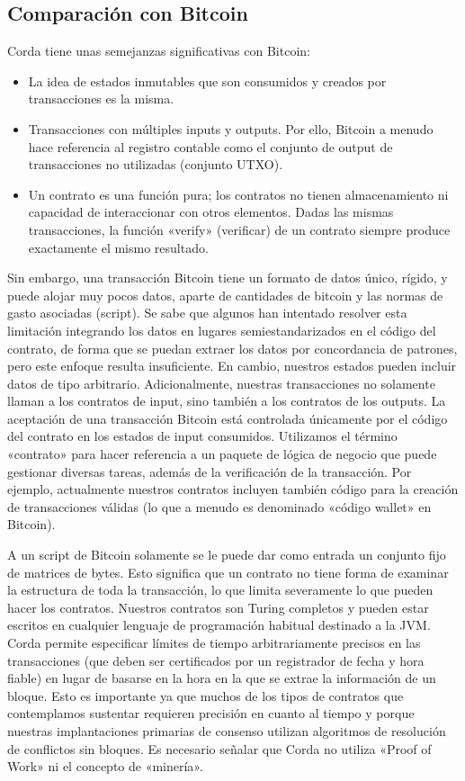 \documentclass{article}
\begin{document}
\subsection{Comparación con Bitcoin}
Corda tiene unas semejanzas significativas con Bitcoin: 
\begin{itemize}
\item{La idea de estados inmutables que son consumidos y creados por transacciones es la misma.}
\item{Transacciones con múltiples inputs y outputs. Por ello, Bitcoin a menudo hace referencia al registro contable como el conjunto de output de transacciones no utilizadas (conjunto UTXO).}
\item{Un contrato es una función pura; los contratos no tienen almacenamiento ni capacidad de interaccionar con otros elementos. Dadas las mismas transacciones, la función «verify» (verificar) de un contrato siempre produce exactamente el mismo resultado.}
\end{itemize}

Sin embargo, una transacción Bitcoin tiene un formato de datos único, rígido, y puede alojar muy pocos datos, aparte de cantidades de bitcoin y las normas de gasto asociadas (script). Se sabe que algunos han intentado resolver esta limitación integrando los datos en lugares semiestandarizados en el código del contrato, de forma que se puedan extraer los datos por concordancia de patrones, pero este enfoque resulta insuficiente. En cambio, nuestros estados pueden incluir datos de tipo arbitrario. Adicionalmente, nuestras transacciones no solamente llaman a los contratos de input, sino también a los contratos de los outputs. La aceptación de una transacción Bitcoin está controlada únicamente por el código del contrato en los estados de input consumidos. Utilizamos el término «contrato» para hacer referencia a un paquete de lógica de negocio que puede gestionar diversas tareas, además de la verificación de la transacción. Por ejemplo, actualmente nuestros contratos incluyen también código para la creación de transacciones válidas (lo que a menudo es denominado «código wallet» en Bitcoin).


A un script de Bitcoin solamente se le puede dar como entrada un conjunto fijo de matrices de bytes. Esto significa que un contrato no tiene forma de examinar la estructura de toda la transacción, lo que limita severamente lo que pueden hacer los contratos. Nuestros contratos son Turing completos y pueden estar escritos en cualquier lenguaje de programación habitual destinado a la JVM.	
Corda permite especificar límites de tiempo arbitrariamente precisos en las transacciones (que deben ser certificados por un registrador de fecha y hora fiable) en lugar de basarse en la hora en la que se extrae la información de un bloque.  Esto es importante ya que muchos de los tipos de contratos que contemplamos sustentar requieren precisión en cuanto al tiempo y porque nuestras implantaciones primarias de consenso utilizan algoritmos de resolución de conflictos sin bloques. Es necesario señalar que Corda no utiliza «Proof of Work» ni el concepto de «minería».
\end{document}
